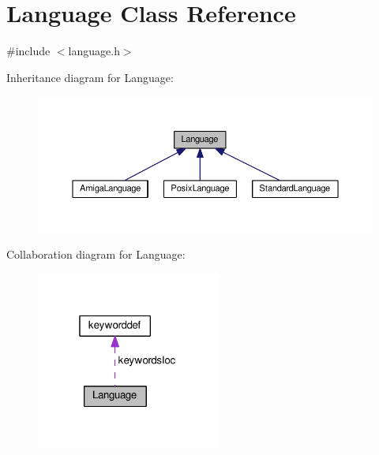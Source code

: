 \hypertarget{classLanguage}{}\section{Language Class Reference}
\label{classLanguage}


{\ttfamily \#include $<$language.\+h$>$}



Inheritance diagram for Language\+:
\nopagebreak
\begin{figure}[H]
\begin{center}
\leavevmode
\includegraphics[width=350pt]{df/d3e/classLanguage__inherit__graph}
\end{center}
\end{figure}


Collaboration diagram for Language\+:
\nopagebreak
\begin{figure}[H]
\begin{center}
\leavevmode
\includegraphics[width=172pt]{d7/ddf/classLanguage__coll__graph}
\end{center}
\end{figure}

